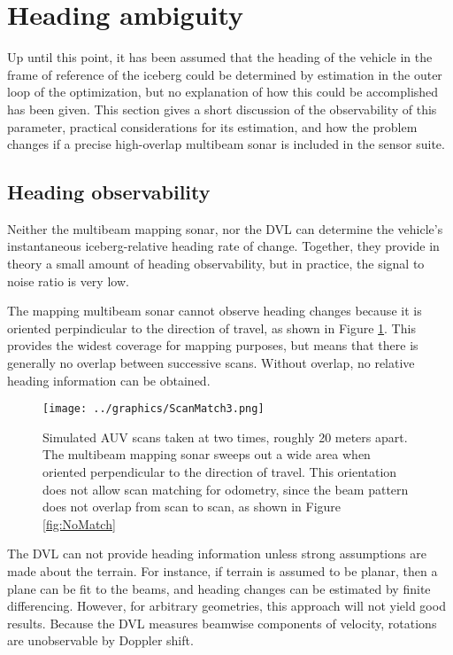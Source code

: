 \section{Heading ambiguity}

Up until this point, it has been assumed that the heading of the vehicle in the frame of reference of the iceberg could be determined by estimation in the outer loop of the optimization, but no explanation of how this could be accomplished has been given. This section gives a short discussion of the observability of this parameter, practical considerations for its estimation, and how the problem changes if a precise high-overlap multibeam sonar is included in the sensor suite.

\subsection{Heading observability}

Neither the multibeam mapping sonar, nor the DVL can determine the vehicle's instantaneous iceberg-relative heading rate of change. Together, they provide in theory a small amount of heading observability, but in practice, the signal to noise ratio is very low.

The mapping multibeam sonar cannot observe heading changes because it is oriented perpindicular to the direction of travel, as shown in Figure \ref{fig:beamOrientation}. This provides the widest coverage for mapping purposes, but means that there is generally no overlap between successive scans. Without overlap, no relative heading information can be obtained. 

\begin{figure}[h]
   \centering
   \texttt{[image: ../graphics/ScanMatch3.png]} %
   \caption{Simulated AUV scans taken at two times, roughly 20 meters apart. The multibeam mapping sonar sweeps out a wide area when oriented perpendicular to the direction of travel. This orientation does not allow scan matching for odometry, since the beam pattern does not overlap from scan to scan, as shown in Figure \ref{fig:NoMatch}}
   \label{fig:beamOrientation}
\end{figure}

The DVL can not provide heading information unless strong assumptions are made about the terrain. For instance, if terrain is assumed to be planar, then a plane can be fit to the beams, and heading changes can be estimated by finite differencing. However, for arbitrary geometries, this approach will not yield good results. Because the DVL measures beamwise components of velocity, rotations are unobservable by Doppler shift. 

